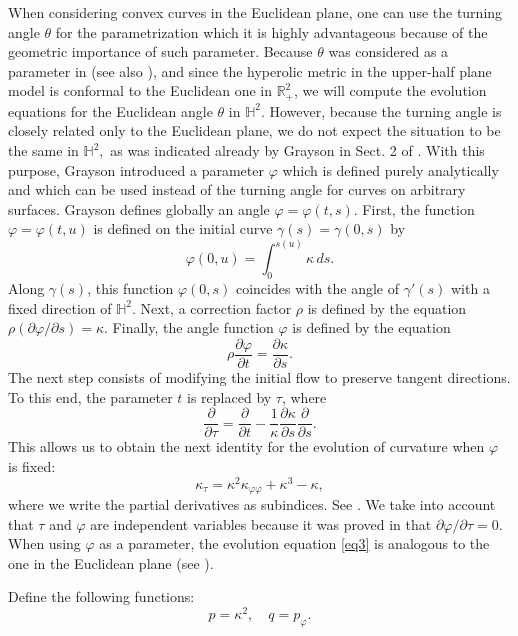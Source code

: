 \documentclass[12pt]{amsart}
\theoremstyle{plain}
\theoremstyle{definition}
\def\h{\mathbb H}
\def\r{\mathbb R}
\begin{document}
When considering convex curves in the Euclidean plane, one can use the turning angle $\theta$ for the parametrization which it is highly advantageous because of the geometric importance of such parameter. Because $\theta$ was considered as a parameter in \cite{dhs} (see also \cite{blt}), and since the hyperolic metric in the upper-half plane model   is conformal to the Euclidean one in $\r^2_{+}$, we will compute the evolution equations for the Euclidean angle $\theta$ in $\h^2.$ However, because the turning angle is closely related only to the Euclidean plane, we do not expect the situation to be the same in $\h^2,$ as was indicated already by Grayson in Sect. 2 of \cite{gr}. With this purpose, Grayson   introduced a parameter $\varphi$ which is defined purely analytically and which can be used instead of the turning angle for curves on arbitrary surfaces. Grayson defines globally an angle $\varphi=\varphi(t,s)$. First, the function $\varphi=\varphi(t,u)$ is defined on the initial curve $\gamma(s)=\gamma(0,s)$ by 
 $$\varphi(0,u)=\int_{0}^{s(u)}\kappa\,ds.$$
 Along $\gamma(s)$, this function $\varphi(0,s)$ coincides with the angle of $\gamma'(s)$ with a fixed direction of $\h^2$. Next, a correction factor $\rho$ is defined by the equation $\rho(\partial\varphi/\partial s)=\kappa$. Finally, the angle function $\varphi$ is defined by  the equation 
$$\rho\frac{\partial\varphi}{\partial t}=\frac{\partial \kappa}{\partial s}.$$
The next step consists of modifying the initial flow to preserve tangent directions. To this end, the parameter $t$ is replaced by $\tau$, where
$$\frac{\partial}{\partial\tau}=\frac{\partial}{\partial t}-\frac{1}{\kappa}\frac{\partial\kappa}{\partial s} \frac{\partial}{\partial s}.$$
  This allows us to obtain the next identity for the evolution of curvature when $\varphi$ is fixed: 
  \begin{equation}\label{eq3}
\kappa_\tau= \kappa^2 \kappa_{\varphi \varphi} + \kappa^3 - \kappa,
\end{equation}
 where we write the partial derivatives as subindices.  See \cite[Lem. 2.7]{gr}. We take into account that $\tau$ and $\varphi$ are independent variables because  it was proved in \cite[Lem.2.1]{gr} that 
$\partial\varphi/\partial \tau=0$. When using $\varphi$ as a parameter, the evolution equation \ref{eq3} is analogous to the one in the Euclidean plane (see \cite{gh}).

Define the following functions: 
$$p = \kappa^2,\quad  q = p_{\varphi}.$$
\end{document}
